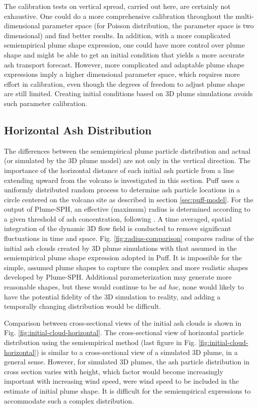 \documentclass[utf8]{frontiersSCNS} %
\begin{document}
The calibration tests on vertical spread, carried out here, are certainly not exhaustive. One could do a more comprehensive calibration throughout the multi-dimensional parameter space (for Poisson distribution, the parameter space is two dimensional) and find better results. In addition, with a more complicated semiempirical plume shape expression, one could have more control over plume shape and might be able to get an initial condition that yields a more accurate ash transport forecast. However, more complicated and adaptable plume shape expressions imply a higher dimensional parameter space, which requires more effort in calibration, even though the degrees of freedom to adjust plume shape are still limited.  Creating initial conditions based on 3D plume simulations avoids such parameter calibration.

\subsection{Horizontal Ash Distribution}

The differences between the semiempirical plume particle distribution and actual (or simulated by the 3D plume model) are not only in the vertical direction. The importance of the horizontal distance of each initial ash particle from a line extending upward from the volcano is investigated in this section.  Puff uses a uniformly distributed random process to determine ash particle locations in a circle centered on the volcano site as described in section \ref{sec:puff-model}. For the output of Plume-SPH, an effective (maximum) radius is determined according to a given threshold of ash concentration, following \citet {cerminara2016large}. A time averaged, spatial integration of the dynamic 3D flow field is conducted to remove significant fluctuations in time and space. Fig. \ref{fig:radius-comparison} compares radius of the initial ash clouds created by 3D plume simulations with that assumed in the semiempirical plume shape expression adopted in Puff. It is impossible for the simple, assumed plume shapes to capture the complex and more realistic shapes developed by Plume-SPH. Additional parameterization may generate more reasonable shapes, but these would continue to be \textit{ad hoc}, none would likely to have the potential fidelity of the 3D simulation to reality, and adding a temporally changing distribution would be difficult.

Comparison between cross-sectional views of the initial ash clouds is shown in Fig. \ref{fig:initial-cloud-horizontal}. The cross-sectional view of horizontal particle distribution using the semiempirical method (last figure in Fig. \ref{fig:initial-cloud-horizontal}) is similar to a cross-sectional view of a simulated 3D plume, in a general sense. However, for simulated 3D plumes, the ash particle distribution in cross section varies with height, which factor would become increasingly important with increasing wind speed, were wind speed to be included in the estimate of initial plume shape. It is difficult for the semiempirical expressions to accommodate such a complex distribution.
\end{document}
